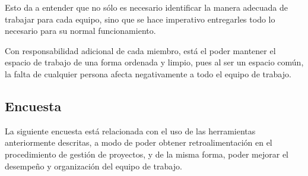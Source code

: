 Esto da a entender que no sólo es necesario identificar
la manera adecuada de trabajar para cada equipo, sino que se hace imperativo
entregarles todo lo necesario para su normal funcionamiento.

Con responsabilidad adicional de cada miembro, está el poder mantener el espacio
de trabajo de una forma ordenada y limpio, pues al ser un espacio común, la falta
de cualquier persona afecta negativamente a todo el equipo de trabajo.

\subsection{Encuesta}

La siguiente encuesta está relacionada con el uso
de las herramientas anteriormente descritas, a modo
de poder obtener retroalimentación en el procedimiento
de gestión de proyectos, y de  la misma forma, poder
mejorar el desempeño y organización del equipo de trabajo.

